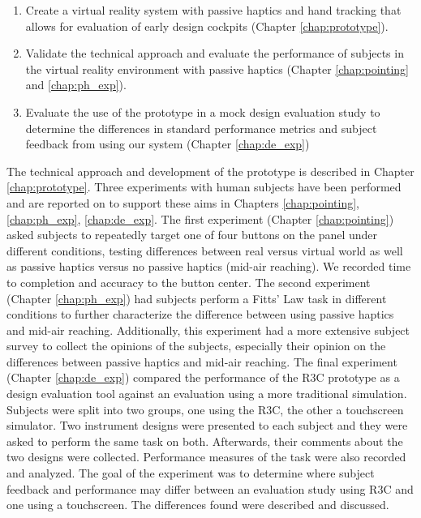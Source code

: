 \begin{enumerate}
    \item Create a virtual reality system with passive haptics and hand tracking that allows for evaluation of early design cockpits (Chapter \ref{chap:prototype}).
    \item Validate the technical approach and evaluate the performance of subjects in the virtual reality environment with passive haptics (Chapter \ref{chap:pointing} and \ref{chap:ph_exp}).
    \item Evaluate the use of the prototype in a mock design evaluation study to determine the differences in standard performance metrics and subject feedback from using our system (Chapter \ref{chap:de_exp})
\end{enumerate}
The technical approach and development of the prototype is described in Chapter \ref{chap:prototype}.
Three experiments with human subjects have been performed and are reported on to support these aims in Chapters \ref{chap:pointing}, \ref{chap:ph_exp}, \ref{chap:de_exp}.
The first experiment (Chapter \ref{chap:pointing}) asked subjects to repeatedly target one of four buttons on the panel under different conditions, testing differences between real versus virtual world as well as passive haptics versus no passive haptics (mid-air reaching).
We recorded time to completion and accuracy to the button center.
The second experiment (Chapter \ref{chap:ph_exp}) had subjects perform a Fitts' Law task in different conditions to further characterize the difference between using passive haptics and mid-air reaching.
Additionally, this experiment had a more extensive subject survey to collect the opinions of the subjects, especially their opinion on the differences between passive haptics and mid-air reaching.
The final experiment (Chapter \ref{chap:de_exp}) compared the performance of the R3C prototype as a design evaluation tool against an evaluation using a more traditional simulation.
Subjects were split into two groups, one using the R3C, the other a touchscreen simulator.
Two instrument designs were presented to each subject and they were asked to perform the same task on both.
Afterwards, their comments about the two designs were collected.
Performance measures of the task were also recorded and analyzed.
The goal of the experiment was to determine where subject feedback and performance may differ between an evaluation study using R3C and one using a touchscreen.
The differences found were described and discussed.


